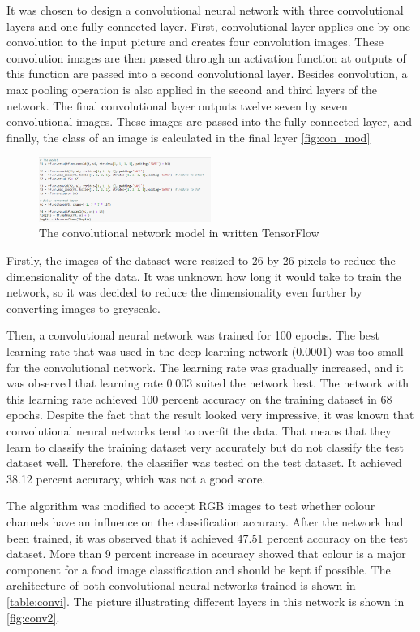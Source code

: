 It was chosen to design a convolutional neural network with three convolutional layers and one fully connected layer. First, convolutional layer applies one by one convolution to the input picture and creates four convolution images. These convolution images are then passed through an activation function at outputs of this function are passed into a second convolutional layer. Besides convolution, a max pooling operation is also applied in the second and third layers of the network. The final convolutional layer outputs twelve seven by seven convolutional images. These images are passed into the fully connected layer, and finally, the class of an image is calculated in the final layer \autoref{fig:con_mod}



\begin{figure}[h]
\centering
\includegraphics[width=0.5\textwidth]{Figures/4/conv.PNG}
\caption{The convolutional network model in written TensorFlow}
\label{fig:con_mod}
\end{figure}

Firstly, the images of the dataset were resized to 26 by 26 pixels to reduce the dimensionality of the data.
It was unknown how long it would take to train the network, so it was decided to reduce the dimensionality even further by converting images to greyscale.

Then, a convolutional neural network was trained for 100 epochs. The best learning rate that was used in the deep learning network (0.0001) was too small for the convolutional network. The learning rate was gradually increased, and it was observed that learning rate 0.003 suited the network best. The network with this learning rate achieved 100 percent accuracy on the training dataset in 68 epochs. Despite the fact that the result looked very impressive, it was known that convolutional neural networks tend to overfit the data. That means that they learn to classify the training dataset very accurately but do not classify the test dataset well. Therefore, the classifier was tested on the test dataset. It achieved 38.12 percent accuracy, which was not a  good score.

The algorithm was modified to accept RGB images to test whether colour channels have an influence on the classification accuracy. After the network had been trained, it was observed that it achieved 47.51 percent accuracy on the test dataset. More than 9 percent increase in accuracy showed that colour is a major component for a food image classification and should be kept if possible. The architecture of both convolutional neural networks trained is shown in \autoref{table:convi}. The picture illustrating different layers in this network is shown in \autoref{fig:conv2}.

